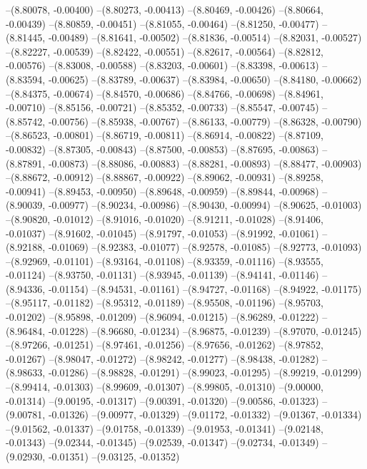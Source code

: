 --(8.80078, -0.00400)
--(8.80273, -0.00413)
--(8.80469, -0.00426)
--(8.80664, -0.00439)
--(8.80859, -0.00451)
--(8.81055, -0.00464)
--(8.81250, -0.00477)
--(8.81445, -0.00489)
--(8.81641, -0.00502)
--(8.81836, -0.00514)
--(8.82031, -0.00527)
--(8.82227, -0.00539)
--(8.82422, -0.00551)
--(8.82617, -0.00564)
--(8.82812, -0.00576)
--(8.83008, -0.00588)
--(8.83203, -0.00601)
--(8.83398, -0.00613)
--(8.83594, -0.00625)
--(8.83789, -0.00637)
--(8.83984, -0.00650)
--(8.84180, -0.00662)
--(8.84375, -0.00674)
--(8.84570, -0.00686)
--(8.84766, -0.00698)
--(8.84961, -0.00710)
--(8.85156, -0.00721)
--(8.85352, -0.00733)
--(8.85547, -0.00745)
--(8.85742, -0.00756)
--(8.85938, -0.00767)
--(8.86133, -0.00779)
--(8.86328, -0.00790)
--(8.86523, -0.00801)
--(8.86719, -0.00811)
--(8.86914, -0.00822)
--(8.87109, -0.00832)
--(8.87305, -0.00843)
--(8.87500, -0.00853)
--(8.87695, -0.00863)
--(8.87891, -0.00873)
--(8.88086, -0.00883)
--(8.88281, -0.00893)
--(8.88477, -0.00903)
--(8.88672, -0.00912)
--(8.88867, -0.00922)
--(8.89062, -0.00931)
--(8.89258, -0.00941)
--(8.89453, -0.00950)
--(8.89648, -0.00959)
--(8.89844, -0.00968)
--(8.90039, -0.00977)
--(8.90234, -0.00986)
--(8.90430, -0.00994)
--(8.90625, -0.01003)
--(8.90820, -0.01012)
--(8.91016, -0.01020)
--(8.91211, -0.01028)
--(8.91406, -0.01037)
--(8.91602, -0.01045)
--(8.91797, -0.01053)
--(8.91992, -0.01061)
--(8.92188, -0.01069)
--(8.92383, -0.01077)
--(8.92578, -0.01085)
--(8.92773, -0.01093)
--(8.92969, -0.01101)
--(8.93164, -0.01108)
--(8.93359, -0.01116)
--(8.93555, -0.01124)
--(8.93750, -0.01131)
--(8.93945, -0.01139)
--(8.94141, -0.01146)
--(8.94336, -0.01154)
--(8.94531, -0.01161)
--(8.94727, -0.01168)
--(8.94922, -0.01175)
--(8.95117, -0.01182)
--(8.95312, -0.01189)
--(8.95508, -0.01196)
--(8.95703, -0.01202)
--(8.95898, -0.01209)
--(8.96094, -0.01215)
--(8.96289, -0.01222)
--(8.96484, -0.01228)
--(8.96680, -0.01234)
--(8.96875, -0.01239)
--(8.97070, -0.01245)
--(8.97266, -0.01251)
--(8.97461, -0.01256)
--(8.97656, -0.01262)
--(8.97852, -0.01267)
--(8.98047, -0.01272)
--(8.98242, -0.01277)
--(8.98438, -0.01282)
--(8.98633, -0.01286)
--(8.98828, -0.01291)
--(8.99023, -0.01295)
--(8.99219, -0.01299)
--(8.99414, -0.01303)
--(8.99609, -0.01307)
--(8.99805, -0.01310)
--(9.00000, -0.01314)
--(9.00195, -0.01317)
--(9.00391, -0.01320)
--(9.00586, -0.01323)
--(9.00781, -0.01326)
--(9.00977, -0.01329)
--(9.01172, -0.01332)
--(9.01367, -0.01334)
--(9.01562, -0.01337)
--(9.01758, -0.01339)
--(9.01953, -0.01341)
--(9.02148, -0.01343)
--(9.02344, -0.01345)
--(9.02539, -0.01347)
--(9.02734, -0.01349)
--(9.02930, -0.01351)
--(9.03125, -0.01352)
